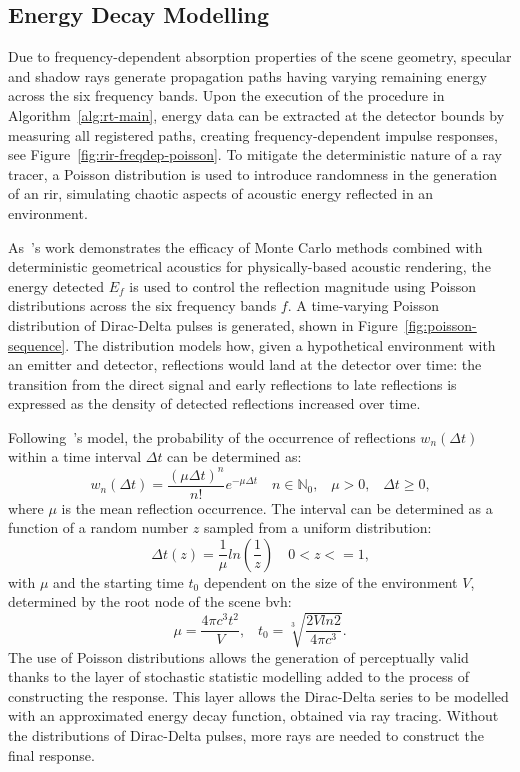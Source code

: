 \subsection{Energy Decay Modelling}
Due to frequency-dependent absorption properties of the scene geometry, specular and shadow rays generate propagation paths having varying remaining energy across the six frequency bands. Upon the execution of the procedure in Algorithm~\ref{alg:rt-main}, energy data can be extracted at the detector bounds by measuring all registered paths, creating frequency-dependent impulse responses, see Figure~\ref{fig:rir-freqdep-poisson}. To mitigate the deterministic nature of a ray tracer, a Poisson distribution is used to introduce randomness in the generation of an \acrshort{rir}, simulating chaotic aspects of acoustic energy reflected in an environment. \par
As~\cite{schroder2011physically}'s work demonstrates the efficacy of Monte Carlo methods combined with deterministic geometrical acoustics for physically-based acoustic rendering, the energy detected $E_f$ is used to control the reflection magnitude using Poisson distributions across the six frequency bands $f$. A time-varying Poisson distribution of Dirac-Delta pulses is generated, shown in Figure~\ref{fig:poisson-sequence}. The distribution models how, given a hypothetical environment with an emitter and detector, reflections would land at the detector over time: the transition from the direct signal and early reflections to late reflections is expressed as the density of detected reflections increased over time.\par
Following~\cite{schroder2011physically}'s model, the probability of the occurrence of reflections $w_n(\Delta t)$ within a time interval $\Delta t$ can be determined as:
\begin{equation}\label{eq:poisson-distributed-diracs}
    w_n(\Delta t) = \frac{(\mu \Delta t)^n}{n!} e^{-\mu \Delta t} \quad n \in \mathbb{N}_0\textrm{,} \quad \mu > 0\textrm{,} \quad \Delta t \ge 0\textrm{,}
\end{equation}
where $\mu$ is the mean reflection occurrence. The interval can be determined as a function of a random number $z$ sampled from a uniform distribution: 
\begin{equation}
    \Delta t(z) = \frac{1}{\mu}ln(\frac{1}{z}) \quad 0 < z <= 1\textrm{,}
\end{equation}
with $\mu$ and the starting time $t_0$ dependent on the size of the environment $V$, determined by the root node of the scene \acrshort{bvh}: 
\begin{equation}
    \mu = \frac{4\pi c^3 t^2}{V}\textrm{,} \quad t_0 = \sqrt[3]{\frac{2Vln2}{4\pi c^3}}\textrm{.}
\end{equation}
The use of Poisson distributions allows the generation of perceptually valid  thanks to the layer of stochastic statistic modelling added to the process of constructing the response. This layer allows the Dirac-Delta series to be modelled with an approximated energy decay function, obtained via ray tracing. Without the distributions of Dirac-Delta pulses, more rays are needed to construct the final response.

